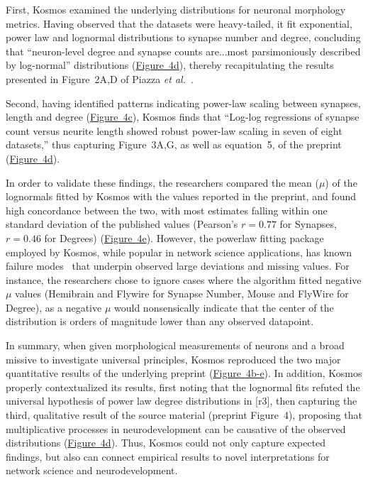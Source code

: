 \documentclass{article}
\begin{document}
First, Kosmos examined the underlying distributions for neuronal morphology metrics. Having observed that the datasets were heavy-tailed, it fit exponential, power law and lognormal distributions to synapse number and degree, concluding that ``neuron-level degree and synapse counts are...most parsimoniously described by log-normal'' distributions (\hyperref[fig:fig4]{Figure~4d}), thereby recapitulating the results presented in Figure~2A,D of Piazza \textit{et al.}~\cite{piazza_physical_2025}.

Second, having identified patterns indicating power-law scaling between synapses, length and degree (\hyperref[fig:fig4]{Figure~4c}), Kosmos finds that ``Log-log regressions of synapse count versus neurite length showed robust power-law scaling in seven of eight datasets,'' thus capturing Figure~3A,G, as well as equation~5, of the preprint~\cite{piazza_physical_2025} (\hyperref[fig:fig4]{Figure~4d}). 

In order to validate these findings, the researchers compared the mean ($\mu$) of the lognormals fitted by Kosmos with the values reported in the preprint, and found high concordance between the two, with most estimates falling within one standard deviation of the published values (Pearson's $r=0.77$ for Synapses, $r=0.46$ for Degrees) (\hyperref[fig:fig4]{Figure~4e}). However, the powerlaw fitting package employed by Kosmos, while popular in network science applications, has known failure modes~\cite{hoorn_problems_2020} that underpin observed large deviations and missing values. For instance, the researchers chose to ignore cases where the algorithm fitted negative $\mu$ values (Hemibrain and Flywire for Synapse Number, Mouse and FlyWire for Degree), as a negative $\mu$ would nonsensically indicate that the center of the distribution is orders of magnitude lower than any observed datapoint. 

In summary, when given morphological measurements of neurons and a broad missive to investigate universal principles, Kosmos reproduced the two major quantitative results of the underlying preprint (\hyperref[fig:fig4]{Figure~4b-e}). In addition, Kosmos properly contextualized its results, first noting that the lognormal fits refuted the universal hypothesis of power law degree distributions in [r3], then capturing the third, qualitative result of the source material (preprint Figure~4), proposing that multiplicative processes in neurodevelopment can be causative of the observed distributions (\hyperref[fig:fig4]{Figure~4d}). Thus, Kosmos could not only capture expected findings, but also can connect empirical results to novel interpretations for network science and neurodevelopment. 
\end{document}
